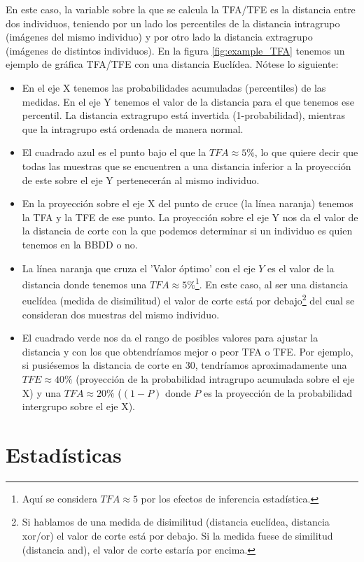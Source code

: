 En este caso, la variable sobre la que se calcula la TFA/TFE es la distancia entre dos individuos, teniendo por un lado los percentiles de la distancia intragrupo (imágenes del mismo individuo) y por otro lado la distancia extragrupo (imágenes de distintos individuos). En la figura \ref{fig:example_TFA} tenemos un ejemplo de gráfica TFA/TFE con una distancia Euclídea. Nótese lo siguiente:
\begin{itemize}
	\item{En el eje X tenemos las probabilidades acumuladas (percentiles) de las medidas. En el eje Y tenemos el valor de la distancia para el que tenemos ese percentil. La distancia extragrupo está invertida (1-probabilidad), mientras que la intragrupo está ordenada de manera normal.}
	\item{El cuadrado azul es el punto bajo el que la $TFA\approx5\%$, lo que quiere decir que todas las muestras que se encuentren a una distancia inferior a la proyección de este sobre el eje Y pertenecerán al mismo individuo.}
	\item{En la proyección sobre el eje X del punto de cruce (la línea naranja) tenemos la TFA y la TFE de ese punto. La proyección sobre el eje Y nos da el valor de la distancia de corte con la que podemos determinar si un individuo es quien tenemos en la BBDD o no.}
	\item{La línea naranja que cruza el 'Valor óptimo' con el eje $Y$ es el valor de la distancia donde tenemos una $TFA\approx5\%$\footnote{Aquí se considera $TFA\approx5$ por los efectos de inferencia estadística.}. En este caso, al ser una distancia euclídea (medida de disimilitud) el valor de corte está por debajo\footnote{Si hablamos de una medida de disimilitud (distancia euclídea, distancia xor/or) el valor de corte está por debajo. Si la medida fuese de similitud (distancia and), el valor de corte estaría por encima.} del cual se consideran dos muestras del mismo individuo. }
	\item{El cuadrado verde nos da el rango de posibles valores para ajustar la distancia y con los que obtendríamos mejor o peor TFA o TFE. Por ejemplo, si pusiésemos la distancia de corte en 30, tendríamos aproximadamente una $TFE\approx40\%$ (proyección de la probabilidad intragrupo acumulada sobre el eje X) y una $TFA\approx20\%$ ($(1-P)$ donde $P$ es la proyección de la probabilidad intergrupo sobre el eje X).} 
\end{itemize}

\section{Estadísticas}

